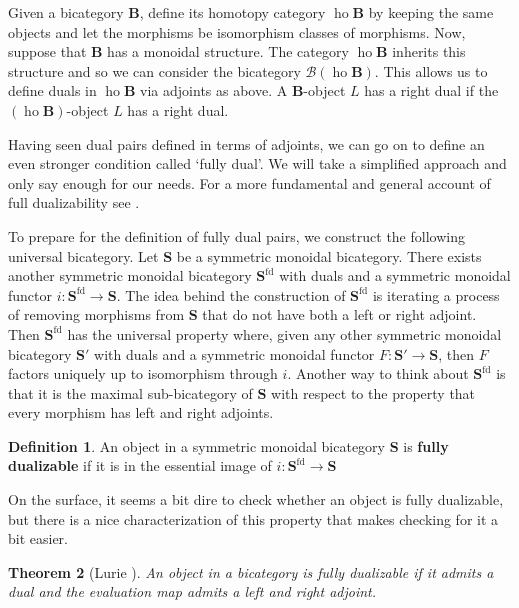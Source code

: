 \documentclass[11pt]{amsart}
\newcommand{\op}[1]{\operatorname{#1}}
\newcommand{\cat}[1]{\mathbf{#1}}
\newcommand{\from}{\colon}
\newtheorem{thm}{Theorem}[section]
\theoremstyle{remark}
\theoremstyle{definition}
\newtheorem{defn}[thm]{Definition}
\begin{document}
Given a bicategory $\cat{B}$, define its homotopy category $\op{ho} \cat{B}$ by keeping the same objects and let the morphisms be isomorphism classes of morphisms. Now, suppose that $\cat{B}$ has a monoidal structure. The category $\op{ho} \cat{B}$ inherits this structure and so we can consider the bicategory $\mathcal{B} (\op{ho} \cat{B})$. This allows us to define duals in $\op{ho}\cat{B}$ via adjoints as above. A $\cat{B}$-object $L$ has a right dual if the $(\op{ho} \cat{B})$-object $L$ has a right dual.

Having seen dual pairs defined in terms of adjoints, we can go on to define an even stronger condition called `fully dual'.  We will take a simplified approach and only say enough for our needs. For a more fundamental and general account of full dualizability see \cite{Lurie,Piotr}. 

To prepare for the definition of fully dual pairs, we construct the following universal bicategory. Let $\cat{S}$ be a symmetric monoidal bicategory. There exists another symmetric monoidal bicategory $\cat{S}^{\text{fd}}$ with duals and a symmetric monoidal functor $i \from \cat{S}^{\text{fd}} \to \cat{S}$.  The idea behind the construction of $\cat{S}^{\text{fd}}$ is iterating a process of removing morphisms from $\cat{S}$ that do not have both a left or right adjoint. Then $\cat{S}^{\text{fd}}$ has the universal property where, given any other symmetric monoidal bicategory $\cat{S}'$ with duals and a symmetric monoidal functor $F \from \cat{S}' \to \cat{S}$, then $F$ factors uniquely up to isomorphism through $i$. Another way to think about $\cat{S}^{\text{fd}}$ is that it is the maximal sub-bicategory of $\cat{S}$ with respect to the property that every morphism has left and right adjoints.  

\begin{defn}
\label{def:FullDual}
	An object in a symmetric monoidal bicategory $\cat{S}$ is \textbf{fully dualizable} if it is in the essential image of $i \from \cat{S}^{\text{fd}} \to \cat{S}$
\end{defn}  

On the surface, it seems a bit dire to check whether an object is fully dualizable, but there is a nice characterization of this property that makes checking for it a bit easier.

\begin{thm}[Lurie {\cite[Prop.~4.2.3]{Lurie}}]
	An object in a bicategory is fully dualizable if it admits a dual and the evaluation map admits a left and right adjoint.  
\end{thm}
\end{document}
